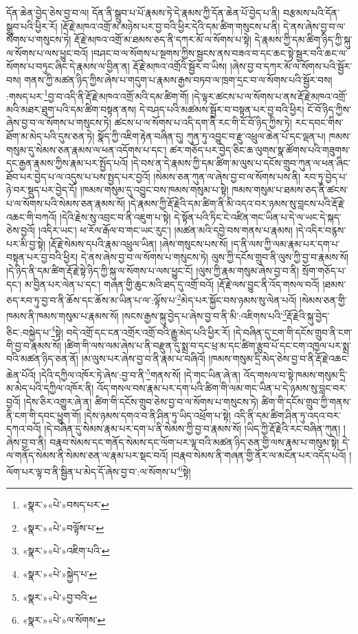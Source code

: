 དོན་ཆེན་བྱེད་ཅེས་བྱ་བ་ལ། དོན་ནི་སྒྲུབ་པ་པོ་རྣམས་ཏེ་དེ་རྣམས་ཀྱི་དོན་ཆེན་པོ་བྱེད་པ་ནི། བརྩམས་པའི་དོན་སྒྲུབ་པའི་ཕྱིར་རོ། །རྡོ་རྗེ་མཁའ་འགྲོ་མ་མཉེས་པར་བྱ་བའི་ཕྱིར་དེའི་དམ་ཚིག་གསུངས་པ་ནི། དེ་ནས་ཞེས་བྱ་བ་ལ་སོགས་པ་གསུངས་ཏེ། རྡོ་རྗེ་མཁའ་འགྲོ་མ་ཐམས་ཅད་ནི་དཀར་མོ་ལ་སོགས་པ་སྟེ། དེ་རྣམས་ཀྱི་དམ་ཚིག་ཉིད་ཀྱི་སྐུ་ལ་སོགས་པ་ལས་ཕྱུང་བའོ། །བཤང་བ་ལ་སོགས་པ་སྔགས་ཀྱིས་སྦྱངས་ནས་བཟའ་བ་དང་ཆང་སྟེ་སྦྱར་བའི་ཆང་ལ་སོགས་པ་བཏུང་ཞིང་དེ་རྣམས་ལ་བྱིན་ན། རྡོ་རྗེ་མཁའ་འགྲོའི་སྦྱོར་བ་ཡིས། །ཞེས་བྱ་བ་དཀར་མོ་ལ་སོགས་པའི་སྦྱོར་བས། གནས་ཀྱི་མཚན་ཉིད་ཀྱིས་ཞེས་པ་གདུག་པ་རྣམས་རྒྱས་བཏབ་ལ་ཁྲག་དྲང་བ་ལ་སོགས་པའི་སྦྱོར་བས། :གསད་པར་\footnote{«སྣར་»«པེ་»བསད་པར་}བྱ་བ་འདི་ནི་རྡོ་རྗེ་མཁའ་འགྲོ་མའི་དམ་ཚིག་གོ། །དེ་ལྟར་ཚངས་པ་ལ་སོགས་པ་ནས་རྡོ་རྗེ་མཁའ་འགྲོ་མའི་མཐར་ཐུག་པའི་དམ་ཚིག་བསྟན་ནས། དེ་བཤད་པའི་མཚམས་སྦྱོར་བ་བསྟན་པར་བྱ་བའི་ཕྱིར། ངོ་བོ་ཉིད་ཀྱིས་ཞེས་བྱ་བ་ལ་སོགས་པ་གསུངས་ཏེ། ཚངས་པ་ལ་སོགས་པ་འདི་དག་ནི་རང་གི་ངོ་བོ་ཉིད་ཀྱིས་ཏེ། རང་དབང་གིས་ཐོག་མ་མེད་པའི་དུས་ཅན་ཏེ། སྣོད་ཀྱི་འཇིག་རྟེན་བཞིན་དུ། ཀུན་ཏུ་འབྱུང་བ་རྫུ་འཕྲུལ་ཆེན་པོ་དང་ལྡན་པ། ཁམས་གསུམ་དུ་སེམས་ཅན་རྣམས་ལ་ཕན་འདོགས་པ་དང་། ཚར་གཅོད་པར་བྱེད་ཅིང་ཆ་ལུགས་སྣ་ཚོགས་པའི་གཟུགས་དང་རྒྱན་རྣམས་ཀྱིས་རྣམ་པར་སྤྱོད་པའོ། །དེ་བས་ན་དེ་རྣམས་ཀྱི་དམ་ཚིག་མ་ལུས་པ་དངོས་གྲུབ་ཀུན་ལ་ཕན་ཞིང་ཐོབ་པར་བྱེད་པ་ལ་འདུས་པ་པས་སྤྱད་པར་བྱའོ། །སེམས་ཅན་ཀུན་ལ་ཞེས་བྱ་བ་ལ་སོགས་པས་ནི། རབ་ཏུ་བྱེད་པ་ཉེ་བར་སྡུད་པར་བྱེད་དོ། །ཁམས་གསུམ་དུ་འབྱུང་བས་ཁམས་གསུམ་པ་སྟེ། ཁམས་གསུམ་པ་ཐམས་ཅད་ནི་ཚངས་པ་ལ་སོགས་པའི་སེམས་ཅན་རྣམས་སོ། །དེ་རྣམས་ཀྱི་རྡོ་རྗེའི་དམ་ཚིག་ནི་མི་འདའ་བར་ཉམས་སུ་བླངས་པའི་རྡོ་རྗེ་འཆང་གི་བཀའོ། །དེའི་རྗེས་སུ་འབྲང་བ་ནི་འཇུག་པ་སྟེ། དེ་སྟོན་པའི་ཏིང་ངེ་འཛིན་གང་ཡིན་པ་དེ་ལ་ཡང་དེ་སྐད་ཅེས་བྱའོ། །འདིར་ཡང་། ཕ་རོལ་རྒོལ་བ་གང་ཡང་རུང་། །མཚན་མའི་དབྱེ་བས་གནས་པ་རྣམས། །དེ་འདིར་བརྙས་པར་མི་བྱ་སྟེ། །རྡོ་རྗེ་སེམས་དཔའི་རྣམ་འཕྲུལ་ཡིན། །ཞེས་གསུངས་པས་སོ། །ད་ནི་ལས་ཀྱི་ལམ་རྣམ་པར་དག་པ་བསྟན་པར་བྱ་བའི་ཕྱིར། དེ་ནས་ཞེས་བྱ་བ་ལ་སོགས་པ་གསུངས་ཏེ། ལུས་ཀྱི་དངོས་གྲུབ་ནི་ལུས་ཀྱི་བྱ་བ་རྣམས་སོ། །དེ་ཉིད་ནི་དམ་ཚིག་རྡོ་རྗེ་སྟེ་ཉིད་ཀྱི་སྐུ་ལ་སོགས་པ་ལས་ཕྱུང་ངོ། །ལུས་ཀྱི་རྣམ་གསུམ་ཞེས་བྱ་བ་ནི། སྲོག་གཅོད་པ་དང་། མ་བྱིན་པར་ལེན་པ་དང་། གཞན་གྱི་ཆུང་མའི་ཐད་དུ་འགྲོ་བའོ། །རྡོ་རྗེ་ལས་བྱུང་ནི་འོད་གསལ་བའོ། །ཐམས་ཅད་རབ་ཏུ་བྱ་བ་ནི་ཆོས་དང་ཆོས་མ་ཡིན་པ་ལ་:ལྟོས་པ་\footnote{«སྣར་»«པེ་»བལྟོས་པ་}མེད་པར་སྐྱོང་བས་ཉམས་སུ་ལེན་པའོ། །སེམས་ཅན་གྱི་ཁམས་ནི་ཁམས་གསུམ་པ་རྣམས་སོ། །སངས་རྒྱས་སྐུ་བྱེད་པ་ཞེས་བྱ་བ་ནི་མི་:འཇིགས་པའི་\footnote{«སྣར་»«པེ་»འཇིག་པའི་}རྡོ་རྗེའི་སྐུ་བྱེད་ཅིང་:བསྐྱེད་པ་\footnote{«སྣར་»«པེ་»སྐྱེད་པ་}སྟེ། བདེ་འགྲོ་དང་ངན་འགྲོར་འགྲོ་བའི་རྒྱུ་མེད་པའི་ཕྱིར་རོ། །དེ་བཞིན་དུ་ངག་གི་དངོས་གྲུབ་ནི་ངག་གི་བྱ་བ་རྣམས་སོ། །ཚིག་གི་ལས་ལམ་ཞེས་པ་ནི་བརྫུན་དུ་སྨྲ་བ་དང་ཕྲ་མ་དང་ཚིག་རྩུབ་པོ་དང་ངག་འཁྱལ་པར་སྨྲ་བའི་མཚན་ཉིད་ཅན་ནོ། །མ་ལུས་པར་ཞེས་བྱ་བ་ནི་རྣམ་པ་བཞིའོ། །ཁམས་གསུམ་དྲི་མེད་ཅེས་བྱ་བ་ནི་རྡོ་རྗེ་འཆང་ཆེན་པོའོ། །དེའི་དཀྱིལ་འཁོར་ཏེ་ཞེས་:བྱ་བ་ནི་\footnote{«སྣར་»«པེ་»བྱ་བའི་}གནས་སོ། །དེ་གང་ཡིན་ཞེ་ན། འོད་གསལ་བ་སྟེ་ཁམས་གསུམ་དྲི་མ་མེད་པའི་དཀྱིལ་འཁོར་ནི། འོད་གསལ་བས་རྣམ་པར་དག་པའི་ཚིག་གི་ལམ་གང་ཡིན་པ་དེ་ཉམས་སུ་བླང་བར་བྱའོ། །དེས་ཅིར་འགྱུར་ཞེ་ན། ཚིག་གི་དངོས་གྲུབ་ཅེས་བྱ་བ་ལ་སོགས་པ་གསུངས་ཏེ། ཚིག་གི་དངོས་གྲུབ་ཀྱི་གནས་ནི་ངག་གི་དབང་ཕྱུག་གོ། །དེས་ཉམས་དགའ་བ་ནི་ཤིན་ཏུ་ཡིད་འཕྲོག་པ་སྟེ། འདི་ནི་དམ་ཚིག་ཤིན་ཏུ་འདའ་བར་དཀའ་བའོ། །དེ་བཞིན་དུ་སེམས་རྣམ་པར་དག་པ་ནི་སེམས་ཀྱི་བྱ་བ་རྣམས་སོ། །ཡིད་ཀྱི་རྡོ་རྗེའི་རང་བཞིན་ཀུན། །ཞེས་བྱ་བ་ནི། བརྣབ་སེམས་དང་གནོད་སེམས་དང་ལོག་པར་ལྟ་བའི་མཚན་ཉིད་ཅན་གྱི་ལས་རྣམ་པ་གསུམ་སྟེ། དེ་ལ་གནོད་སེམས་ནི་སེམས་ཅན་ལ་རྣམ་པར་སྡང་བའོ། །བརྣབ་སེམས་ནི་གཞན་གྱི་ནོར་ལ་མངོན་པར་འདོད་པའོ། །ལོག་པར་ལྟ་བ་ནི་སྦྱིན་པ་མེད་དོ་ཞེས་བྱ་བ་:ལ་སོགས་པ་\footnote{«སྣར་»«པེ་»ལ་སོགས་}སྟེ། 